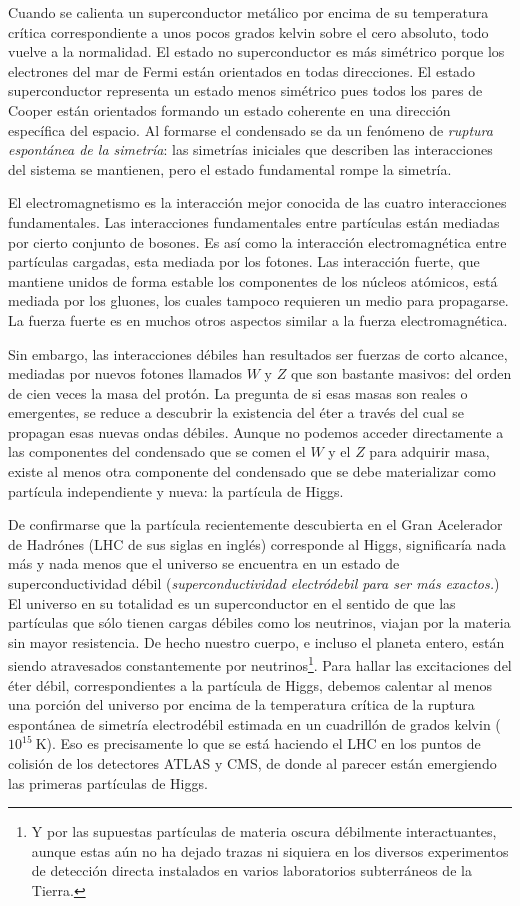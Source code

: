 Cuando se calienta un superconductor metálico por encima de su temperatura crítica correspondiente a unos pocos grados kelvin sobre el cero absoluto, todo vuelve a la normalidad. El estado no superconductor es más simétrico porque los electrones del mar de Fermi están orientados en todas direcciones. El estado superconductor representa un estado menos simétrico pues todos los pares de Cooper están orientados formando un estado coherente en una dirección específica del espacio. Al formarse el condensado se da un fenómeno de \emph{ruptura espontánea de la simetría}: las simetrías iniciales que describen las interacciones del sistema se mantienen, pero el estado fundamental rompe la simetría.  

El electromagnetismo es la interacción mejor conocida de las cuatro interacciones fundamentales. Las interacciones fundamentales  entre partículas están mediadas por cierto conjunto de bosones.  Es así como la interacción electromagnética entre partículas cargadas, esta mediada por los fotones. Las interacción fuerte, que mantiene unidos de forma estable los componentes de los núcleos atómicos, está mediada por los gluones, los cuales tampoco requieren un medio para propagarse. La fuerza fuerte es en muchos otros aspectos similar a la fuerza electromagnética. 

Sin embargo, las interacciones débiles han resultados ser fuerzas de corto alcance, mediadas por nuevos fotones llamados $W$ y $Z$ que son bastante masivos: del orden de cien veces la masa del protón. La pregunta de si esas masas son reales o emergentes, se reduce a descubrir la existencia del éter a través del cual se propagan esas nuevas ondas débiles. Aunque no podemos acceder directamente a las componentes del condensado que se comen el $W$ y el $Z$ para adquirir masa, existe al menos otra componente del condensado que se debe materializar como partícula independiente y nueva: la partícula de Higgs. 

De confirmarse que la partícula recientemente descubierta en el Gran Acelerador de Hadrónes (LHC de sus siglas en inglés) corresponde al Higgs, significaría nada más y nada menos que el universo se encuentra en un estado de superconductividad débil (\emph{superconductividad electródebil para ser más exactos.}) El universo en su totalidad es un superconductor en el sentido de que las partículas que sólo tienen cargas débiles como los neutrinos, viajan por la materia sin mayor resistencia. De hecho nuestro cuerpo, e incluso el planeta entero, están siendo atravesados constantemente por neutrinos\footnote{Y por las supuestas partículas de materia oscura débilmente interactuantes, aunque estas aún no ha dejado trazas ni siquiera en los diversos experimentos de detección directa instalados en varios laboratorios subterráneos de la Tierra.}. Para hallar las excitaciones del éter débil, correspondientes a la partícula de Higgs, debemos calentar al menos una porción del universo por encima de la temperatura crítica de la ruptura espontánea de simetría electrodébil estimada en un cuadrillón de grados kelvin ($10^{15}\ $K). Eso es precisamente lo que se está haciendo el LHC en los puntos de colisión de los detectores ATLAS y CMS, de donde al parecer están emergiendo las primeras partículas de Higgs. 



